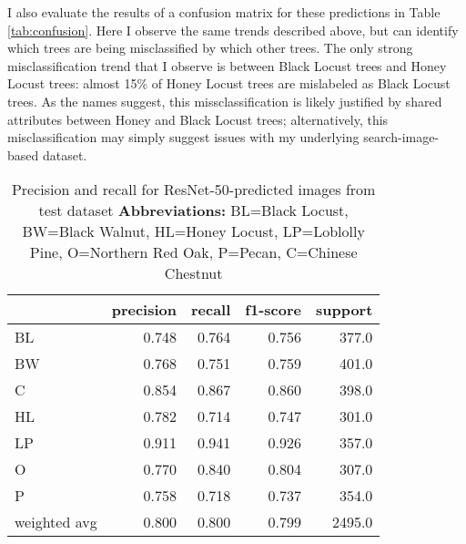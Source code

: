 \documentclass[10pt,twocolumn,letterpaper]{article}
\begin{document}
I also evaluate the results of a confusion matrix for these predictions in Table \ref{tab:confusion}. Here I observe the same trends described above, but can identify which trees are being misclassified by which other trees. The only strong misclassification trend that I observe is between Black Locust trees and Honey Locust trees: almost 15\% of Honey Locust trees are mislabeled as Black Locust trees. As the names suggest, this missclassification is likely justified by shared attributes between Honey and Black Locust trees; alternatively, this misclassification may simply suggest issues with my underlying search-image-based dataset. 

\begin{table}[!htbp]
  \begin{center}
    \small
    \begin{tabular}{lrrrr}
      \toprule
      {} &  precision &  recall &  f1-score &  support \\
      \midrule
      BL           &      0.748 &   0.764 &     0.756 &    377.0 \\
      BW           &      0.768 &   0.751 &     0.759 &    401.0 \\
      C            &      0.854 &   0.867 &     0.860 &    398.0 \\
      HL           &      0.782 &   0.714 &     0.747 &    301.0 \\
      LP           &      0.911 &   0.941 &     0.926 &    357.0 \\
      O            &      0.770 &   0.840 &     0.804 &    307.0 \\
      P            &      0.758 &   0.718 &     0.737 &    354.0 \\
      weighted avg &      0.800 &   0.800 &     0.799 &   2495.0 \\
      \bottomrule
      \end{tabular}
  \end{center}
  \caption{\label{tab:recall} Precision and recall for ResNet-50-predicted images from test dataset \textbf{Abbreviations:} BL=Black Locust, BW=Black Walnut, HL=Honey Locust, LP=Loblolly Pine, O=Northern Red Oak, P=Pecan, C=Chinese Chestnut}
  \end{table}
\end{document}
